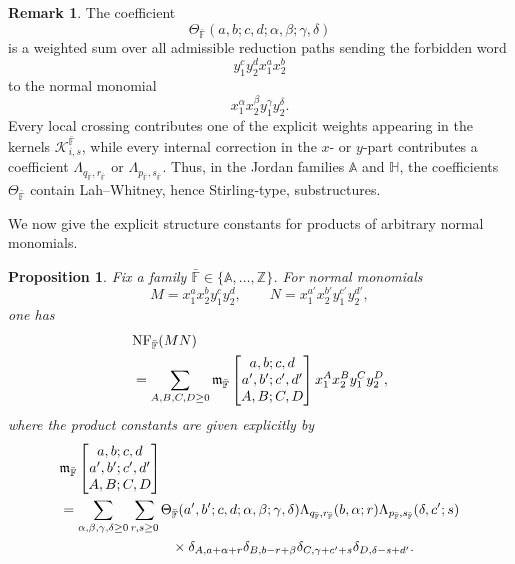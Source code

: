 \documentclass{amsart}
\newtheorem{proposition}[theorem]{Proposition}
\theoremstyle{definition}
\newtheorem{remark}[theorem]{Remark}
\theoremstyle{remark}
\numberwithin{equation}{section}
\begin{document}
\begin{remark}\label{RemarkThetaWeightedPaths}
The coefficient
\[
\Theta_{\bar{\mathbb{F}}}(a,b;c,d;\alpha,\beta;\gamma,\delta)
\]
is a weighted sum over all admissible reduction paths sending the forbidden word
\[
y_1^cy_2^dx_1^ax_2^b
\]
to the normal monomial
\[
x_1^\alpha x_2^\beta y_1^\gamma y_2^\delta.
\]
Every local crossing contributes one of the explicit weights appearing in the kernels $\mathscr{K}_{i,s}^{\bar{\mathbb{F}}}$, while every internal correction in the $x$- or $y$-part contributes a coefficient $\Lambda_{q_{\bar{\mathbb{F}}},r_{\bar{\mathbb{F}}}}$ or $\Lambda_{p_{\bar{\mathbb{F}}},s_{\bar{\mathbb{F}}}}$. Thus, in the Jordan families $\mathbb{A}$ and $\mathbb{H}$, the coefficients $\Theta_{\bar{\mathbb{F}}}$ contain Lah--Whitney, hence Stirling-type, substructures.
\end{remark}

We now give the explicit structure constants for products of arbitrary normal monomials.

\begin{proposition}\label{PropositionExplicitProductConstants}
Fix a family $\bar{\mathbb{F}}\in\{\mathbb{A},\ldots,\mathbb{Z}\}$. For normal monomials
\[
M=x_1^ax_2^by_1^cy_2^d,
\qquad
N=x_1^{a'}x_2^{b'}y_1^{c'}y_2^{d'},
\]
one has
\begin{align}
&{\rm NF}_{\bar{\mathbb{F}}}(MN)
\notag\\
&=
\sum_{A,B,C,D\ge0}
\mathfrak{m}_{\bar{\mathbb{F}}}
\begin{bmatrix}
a,b;c,d\\
a',b';c',d'\\
A,B;C,D
\end{bmatrix}
x_1^Ax_2^By_1^Cy_2^D,
\label{EquationProductConstantExpansionExplicit}
\end{align}
where the product constants are given explicitly by
\begin{align}
&\mathfrak{m}_{\bar{\mathbb{F}}}
\begin{bmatrix}
a,b;c,d\\
a',b';c',d'\\
A,B;C,D
\end{bmatrix}
\notag\\
&=
\sum_{\alpha,\beta,\gamma,\delta\ge0}
\sum_{r,s\ge0}
\Theta_{\bar{\mathbb{F}}}(a',b';c,d;\alpha,\beta;\gamma,\delta)
\Lambda_{q_{\bar{\mathbb{F}}},r_{\bar{\mathbb{F}}}}(b,\alpha;r)
\Lambda_{p_{\bar{\mathbb{F}}},s_{\bar{\mathbb{F}}}}(\delta,c';s)
\notag\\
&\qquad\qquad\qquad\qquad
\times
\delta_{A,a+\alpha+r}
\delta_{B,b-r+\beta}
\delta_{C,\gamma+c'+s}
\delta_{D,\delta-s+d'}.
\label{EquationProductConstantsExplicitFormula}
\end{align}
\end{proposition}
\end{document}
